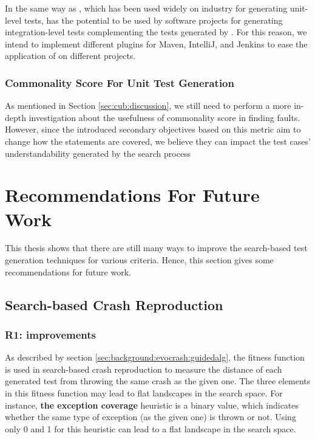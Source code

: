 In the same way as \evosuite, which has been used widely on industry \cite{almasi2017industrial} for generating unit-level tests, \cling has the potential to be used by software projects for generating integration-level tests complementing the tests generated by \evosuite. For this reason, we intend to implement different plugins for Maven, IntelliJ, and Jenkins to ease the application of \cling on different projects.

\subsubsection{Commonality Score For Unit Test Generation}
As mentioned in Section \ref{sec:cub:discussion}, we still need to perform a more in-depth investigation about the usefulness of commonality score in finding faults. However, since the introduced secondary objectives based on this metric aim to change how the statements are covered, we believe they can impact the test cases' understandability generated by the search process


\section{Recommendations For Future Work}
This thesis shows that there are still many ways to improve the search-based test generation techniques for various criteria. Hence, this section gives some recommendations for future work.
\subsection{Search-based Crash Reproduction}

\subsubsection{R1: \CrashFunction improvements}
As described by section \ref{sec:background:evocrash:guidedalg}, the \CrashFunction fitness function is used in search-based crash reproduction to measure the distance of each generated test from throwing the same crash as the given one. The three elements in this fitness function may lead to flat landscapes in the search space. For instance, \textbf{the exception coverage} heuristic is a binary value, which indicates whether the same type of exception (as the given one) is thrown or not. Using only 0 and 1 for this heuristic can lead to a flat landscape in the search space.


